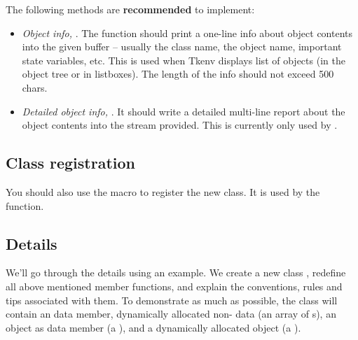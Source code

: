 The following methods are \textbf{recommended} to implement:

\begin{itemize}
  \item{\textit{Object info,} . The  function
        should print a one-line info about object contents into the given
        buffer -- usually the class name, the object name, important state variables, etc.
        This is used when Tkenv displays list of objects (in the object tree
        or in listboxes). The length of the info should not exceed 500 chars.}
  \item{\textit{Detailed object info,} .
        It should write a detailed multi-line report about the object contents
        into the stream provided. This is currently only used by .}
\end{itemize}




\subsection{Class registration}

You should also use the  macro to register the
new class. It is used by the  function.



\subsection{Details}

We'll go through the details using an example. We create a new
class , redefine all above mentioned 
member functions, and explain the conventions, rules and tips
associated with them.
To demonstrate as much as possible, the class will contain
an  data member, dynamically allocated non- data
(an array of s),
an {\opp} object as data member (a ), and
a dynamically allocated {\opp} object (a ).


